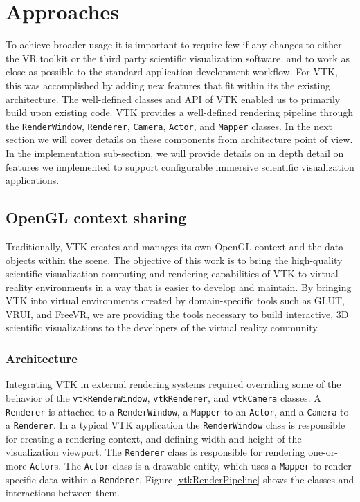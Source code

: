 \section{Approaches}

To achieve broader usage it is important to require few if any changes to either the VR toolkit or the third party scientific visualization software, and to work as close as possible to the standard application development workflow.
For VTK, this was accomplished by adding new features that fit within its the existing architecture. 
The well-defined classes and API of VTK enabled us to primarily build upon existing code.
VTK provides a well-defined rendering pipeline through the \texttt{RenderWindow}, \texttt{Renderer}, \texttt{Camera}, \texttt{Actor}, and \texttt{Mapper} classes.
In the next section we will cover details on these components from architecture point of view.
In the implementation sub-section, we will provide details on in depth detail on features we implemented to support configurable immersive scientific visualization applications. 

\subsection{OpenGL context sharing}

Traditionally, VTK creates and manages its own OpenGL context and the data objects within the scene.
The objective of this work is to bring the high-quality scientific visualization computing and rendering capabilities of VTK to virtual reality environments in a way that is easier to develop and maintain.
By bringing VTK into virtual environments created by domain-specific tools such as GLUT, VRUI, and FreeVR, we are providing the tools necessary to build interactive, 3D scientific visualizations to the developers of the virtual reality community.

\subsubsection{Architecture}

Integrating VTK in external rendering systems required overriding some of the behavior of the \texttt{vtkRenderWindow}, \texttt{vtkRenderer}, and \texttt{vtkCamera} classes.
A \texttt{Renderer} is attached to a \texttt{RenderWindow}, a \texttt{Mapper} to an \texttt{Actor}, and a \texttt{Camera} to a \texttt{Renderer}.
In a typical VTK application the \texttt{RenderWindow} class is responsible for creating a rendering context, and defining width and height of the visualization viewport.
The \texttt{Renderer} class is responsible for rendering one-or-more \texttt{Actor}s.
The \texttt{Actor} class is a drawable entity, which uses a \texttt{Mapper} to render specific data within a \texttt{Renderer}.
Figure \ref{vtkRenderPipeline} shows the classes and interactions between them.


